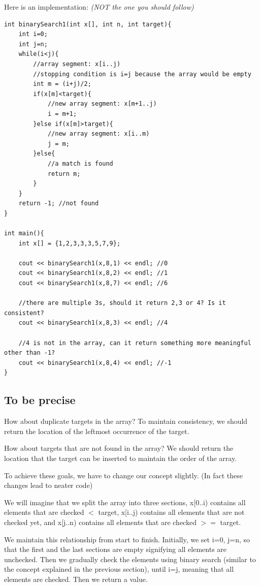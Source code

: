 Here is an implementation: \textit{(NOT the one you should follow)}

\begin{lstlisting}
int binarySearch1(int x[], int n, int target){
    int i=0;
    int j=n;
    while(i<j){
        //array segment: x[i..j)
        //stopping condition is i=j because the array would be empty
        int m = (i+j)/2;
        if(x[m]<target){
            //new array segment: x[m+1..j)
            i = m+1;
        }else if(x[m]>target){
            //new array segment: x[i..m)
            j = m;
        }else{
            //a match is found
            return m;
        }
    }
    return -1; //not found
}

int main(){
    int x[] = {1,2,3,3,3,5,7,9};

    cout << binarySearch1(x,8,1) << endl; //0 
    cout << binarySearch1(x,8,2) << endl; //1
    cout << binarySearch1(x,8,7) << endl; //6

    //there are multiple 3s, should it return 2,3 or 4? Is it consistent?
    cout << binarySearch1(x,8,3) << endl; //4

    //4 is not in the array, can it return something more meaningful other than -1?
    cout << binarySearch1(x,8,4) << endl; //-1
}
\end{lstlisting}

\pagebreak

\subsection*{To be precise}

How about duplicate targets in the array? To maintain consistency, we should return the location of the leftmost occurrence of the target. 

How about targets that are not found in the array? We should return the location that the target can be inserted to maintain the order of the array. 

To achieve these goals, we have to change our concept slightly. (In fact these changes lead to neater code)

We will imagine that we split the array into three sections, x[0..i) contains all elements that are checked $<$ target, x[i..j) contains all elements that are not checked yet, and x[j..n) contains all elements that are checked $>=$ target. 

We maintain this relationship from start to finish. Initially, we set i=0, j=n, so that the first and the last sections are empty signifying all elements are unchecked. Then we gradually check the elements using binary search (similar to the concept explained in the previous section), until i=j, meaning that all elements are checked. Then we return a value.
\vspace{6mm}

